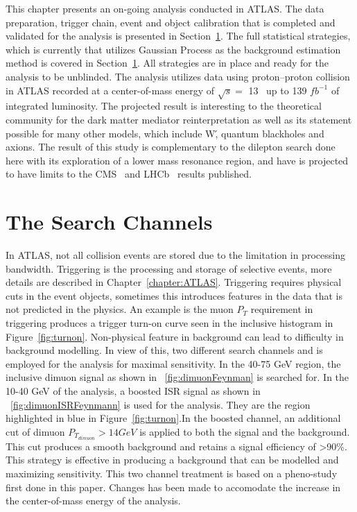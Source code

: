 This chapter presents an on-going analysis conducted in ATLAS. The data preparation, trigger chain, event and object calibration that is completed and validated for the analysis is presented in Section~\ref{}. The full statistical strategies, which is currently that utilizes Gaussian Process as the background estimation method is covered in Section~\ref{}. All strategies are in place and ready for the analysis to be unblinded. The analysis utilizes data using proton--proton collision in ATLAS recorded at a center-of-mass energy of $\sqrt{s}=$ 13 ~\TeV up to 139 $fb^{-1}$ of integrated luminosity. The projected result is interesting to the theoretical community for the dark matter mediator reinterpretation as well as its statement possible for many other models, which include W\', quantum blackholes and axions. The result of this study is complementary to the dilepton search done here with its exploration of a lower mass resonance region, and have is projected to have limits to the CMS~\cite{} and LHCb~\cite{} results published.


%


\section{The Search Channels}
In ATLAS, not all collision events are stored due to the limitation in processing bandwidth. Triggering is the processing and storage of selective events, more details are described in Chapter~\ref{chapter:ATLAS}. Triggering requires physical cuts in the event objects, sometimes this introduces features in the data that is not predicted in the physics. An example is the muon $P_{T}$ requirement in triggering produces a trigger turn-on curve seen in the inclusive histogram in Figure~\ref{fig:turnon}.
Non-physical feature in background can lead to difficulty in background modelling. In view of this, two different search channels and is employed for the analysis for maximal sensitivity. In the 40-75 GeV region, the inclusive dimuon signal as shown in ~\ref{fig:dimuonFeynman} is searched for. In the 10-40 GeV of the analysis, a boosted ISR signal as shown in ~\ref{fig:dimuonISRFeynmann} is used for the analysis. They are the region highlighted in blue in Figure~\ref{fig:turnon}.In the boosted channel, an additional cut of dimuon $P_{T}_{dimuon}>14 GeV$ is applied to both the signal and the background. This cut produces a smooth background and retains a signal efficiency of >90\%. This strategy is effective in producing a background that can be modelled and maximizing sensitivity. 
This two channel treatment is based on a pheno-study first done in this paper\cite{2014}. Changes has been made to accomodate the increase in the center-of-mass energy of the analysis. 

